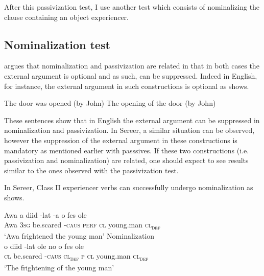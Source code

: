 \documentclass[output=paper]{langscibook}
\begin{document}
\ea \label{ex:tamba:12}
 \label{ex:tamba:12a}
 \label{ex:tamba:12b}
\z
\z

After this passivization test, I use another test which consists of nominalizing the clause containing an object experiencer. 

\subsection{Nominalization test}

\citet{Grimshaw1990} argues that nominalization and passivization are related in that in both cases the external argument is optional and as such, can be suppressed. Indeed in English, for instance, the external argument in such constructions is optional as  shows.

\ea \label{ex:tamba:13}
\ea
The door was opened (by John)
\ex 
The opening of the door (by John)
\z
\z

These sentences show that in English the external argument can be suppressed in nominalization and passivization. In Sereer, a similar situation can be observed, however the suppression of the external argument in these constructions is mandatory as mentioned earlier with passsives. If these two constructions (i.e. passivization and nominalization) are related, one should expect to see results similar to the ones observed with the passivization test. 

In Sereer, Class II experiencer verbs can successfully undergo nominalization as  shows. 

\ea \label{ex:tamba:14}
\ea \label{ex:tamba:14a}
\gll Awa   a    diid          {}-lat    -a      o   fes            ole\\
Awa  \textsc{3sg} be.scared -\textsc{caus} \textsc{perf}  \textsc{cl} young.man \textsc{cl\textsubscript{def}}\\
\glt `Awa frightened the young man'
\ex Nominalization\\ \label{ex:tamba:14b}
\gll o   diid   -lat   ole      no o    fes       ole\\
\textsc{cl} be.scared   -\textsc{caus}  \textsc{cl\textsubscript{def}}  \textsc{p}  \textsc{cl} young.man    \textsc{cl\textsubscript{def}}\\
\glt `The frightening of the young man'
\z
\z
\end{document}
